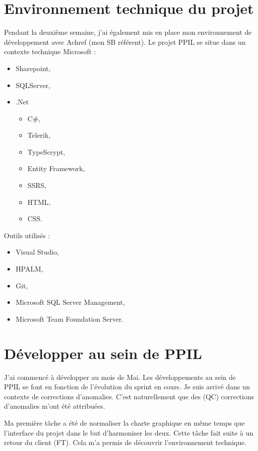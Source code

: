 \section{Environnement technique du projet}

Pendant la deuxième semaine, j'ai également mis en place mon environnement de développement avec Achref (mon SB référent). Le projet PPIL se situe dans un contexte technique Microsoft : 

\begin{itemize}
    \item Sharepoint, 
    \item SQLServer, 
    \item .Net
    \begin{itemize}
        \item C\#, 
        \item Telerik, 
        \item TypeScrypt, 
        \item Entity Framework, 
        \item SSRS, 
        \item HTML, 
        \item CSS.
    \end{itemize}
\end{itemize}

Outils utilisés :
\begin{itemize}
    \item Visual Studio,
    \item HPALM,
    \item Git,
    \item Microsoft SQL Server Management,
    \item Microsoft Team Foundation Server.
\end{itemize}

\section{Développer au sein de PPIL}

J'ai commencé à développer au mois de Mai. Les développements au sein de PPIL se font en fonction de l'évolution du sprint en cours. Je suis arrivé dans un contexte de corrections d'anomalies. C'est naturellement que des (QC) corrections d'anomalies m'ont été attribuées.

Ma première tâche a été de normaliser la charte graphique en même temps que l'interface du projet dans le but d'harmoniser les deux. Cette tâche fait suite à un retour du client (FT). Cela m'a permis de découvrir l'environnement technique. 

